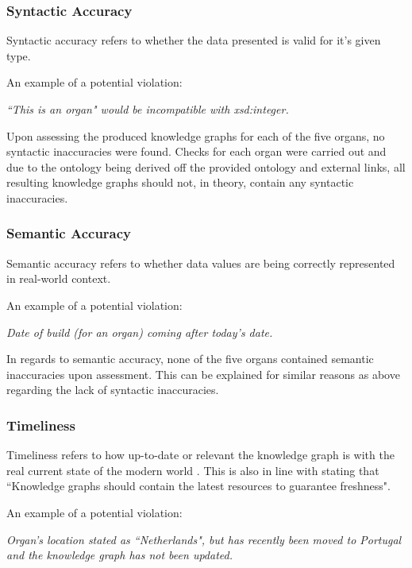 \subsubsection{Syntactic Accuracy}
\hspace{0.5cm} Syntactic accuracy refers to whether the data presented is valid for it's given type. \cite{knowledgegraphevaulationbook}

\noindent An example of a potential violation: 
\begin{displayquote}
    \textit{``This is an organ" would be incompatible with xsd:integer.}
\end{displayquote}

Upon assessing the produced knowledge graphs for each of the five organs, no syntactic inaccuracies were found. Checks for each organ were carried out and due to the ontology being derived off the provided ontology and external links, all resulting knowledge graphs should not, in theory, contain any syntactic inaccuracies. 

\subsubsection{Semantic Accuracy}
\hspace{0.5cm} Semantic accuracy refers to whether data values are being correctly represented in real-world context. \cite{knowledgegraphevaulationbook}

\noindent An example of a potential violation: 
\begin{displayquote}
    \textit{Date of build (for an organ) coming after today's date.}
\end{displayquote}

In regards to semantic accuracy, none of the five organs contained semantic inaccuracies upon assessment. This can be explained for similar reasons as above regarding the lack of syntactic inaccuracies. 

\subsubsection{Timeliness}
\hspace{0.5cm} Timeliness refers to how up-to-date or relevant the knowledge graph is with the real current state of the modern world \cite{knowledgegraphevaulationbook}. This is also in line with \cite{evaluationpaper} stating that ``Knowledge graphs should contain the latest resources to guarantee freshness".

\noindent An example of a potential violation:
\begin{displayquote}
    \textit{Organ's location stated as ``Netherlands", but has recently been moved to Portugal and the knowledge graph has not been updated.}
\end{displayquote}

